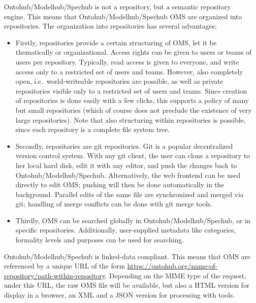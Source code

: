 \documentclass[10pt, a4paper]{isov2}
\begin{document}
Ontohub/Modelhub/Spechub is not a repository, but a semantic repository engine. This
means that Ontohub/Modelhub/Spechub OMS are organized into repositories.
The
organization into repositories has several advantages:
\begin{itemize}
\item
 Firstly, repositories provide a certain structuring of OMS,
 let it be thematically or organizational. Access rights can be given
 to users or teams of users per repository. Typically, read access is
 given to everyone, and write access only to a restricted set of users
 and teams. However, also completely open, i.e.\ world-writeable repositories
 are possible, as well as private repositories visible only to a
 restricted set of users and teams.  Since creation of repositories is
 done easily with a few clicks, this supports a policy of many but
 small repositories (which of course does not preclude the existence
 of very large repositories). Note that also structuring within
 repositories is possible, since each repository is a complete file
 system tree.
 
\item
 Secondly, repositories are git repositories. Git is a popular
 decentralized version control system. With any git client, the user
 can clone a repository to her local hard disk, edit it
 with any editor, and push the changes back to Ontohub/Modelhub/Spechub. Alternatively,
 the web frontend can be used directly to edit OMS; pushing
 will then be done automatically in the background. Parallel edits of
 the same file are synchronized and merged via git; handling of
 merge conflicts can be done with git merge tools.
\item
Thirdly, OMS can be searched globally in Ontohub/Modelhub/Spechub, or in
specific repositories. Additionally, user-supplied metadata like
categories, formality levels and purposes can be used for searching.
\end{itemize}

Ontohub/Modelhub/Spechub is linked-data compliant. This means that OMS are
referenced by a unique URL of the form
\url{https://ontohub.org/name-of-repository/path-within-repository}. Depending
on the MIME type of the request, under this URL, the raw OMS file
will be available, but also a HTML version for display in a browser, 
an XML and a JSON version for processing with tools.

\end{document}
